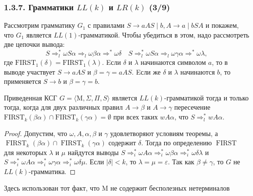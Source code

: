 \begin{frame}
\frametitle{1.3.7. Грамматики $LL(k)$ и $LR(k)$ (3/9)}
\begin{example}
Рассмотрим грамматику \( G_1 \) с правилами 
\(S \rightarrow aAS \mid b, A \rightarrow a \mid bSA \) 
и покажем, что $G_1$ 
является $LL(1)$-грамматикой. 
Чтобы убедиться в этом, надо рассмотреть две цепочки вывода:
 \[
 S \Rightarrow_l^* \omega S\alpha \Rightarrow_l \omega\beta\alpha \Rightarrow^* \omega\delta \quad
 S \Rightarrow_l^* \omega S\alpha \Rightarrow_l \omega\gamma\alpha \Rightarrow^* \omega\lambda ,\]
где \(\mathrm{FIRST}_1(\delta) = \mathrm{FIRST}_1(\lambda)\).
 Eсли \( \delta \) и \( \lambda \) начинаются символом \( a \), то в выводе участвует \( S \to aAS \) и \( \beta = \gamma = aAS \). Eсли же \( \delta \) и \( \lambda \) начинаются \( b \), то применяется \( S \to b \) и \( \beta = \gamma = b \).
\end{example}

\begin{theorem}
Приведенная КСГ $G = \langle \mathrm{M}, \Sigma, \Pi, S \rangle$ является $LL(k)$-грамматикой тогда и только тогда, когда для двух различных правил \( A \to \beta \) и \( A \to \gamma \) пересечение\\ \( \mathrm{FIRST}_k(\beta\alpha) \cap \mathrm{FIRST}_k(\gamma\alpha) = \emptyset \) при всех таких \( wA\alpha \), что \( S \Rightarrow_l^* wA\alpha \).
\end{theorem}
\begin{proof}
Допустим, что \( \omega, A, \alpha, \beta \) и \( \gamma \) 
удовлетворяют условиям теоремы, а \\
\( \operatorname{FIRST}_k(\beta\alpha) \cap \operatorname{FIRST}_k(\gamma\alpha) \) 
содержит \( \delta \). 
Тогда по определению \(\operatorname{FIRST}\) для некоторых \( \lambda \) и \( \mu \) найдутся выводы 
\(
S \Rightarrow_i^* \omega A\alpha \Rightarrow_i^* \omega \beta\alpha \Rightarrow_i^* \omega \delta \lambda
\)
и 
\(
S \Rightarrow_i^* \omega A \alpha \Rightarrow_i^* \omega\gamma\alpha \Rightarrow_i^* \omega \delta \mu.
\)
Если \( |\delta| < k \), то \( \lambda = \mu = \varepsilon \). Так как \( \beta \neq \gamma \), то \( G \) не \( LL(k) \)-грамматика.
\end{proof}
\begin{remark}
Здесь использован тот факт, что \( \mathrm{M} \) не содержит бесполезных нетерминалов
\end{remark}
\end{frame}

